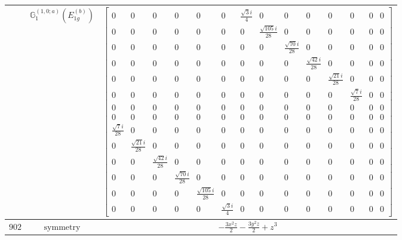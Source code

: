 \documentclass[fleqn,8pt,landscape]{jsarticle}
\begin{document}
\begin{longtable}{ccc}
$  $ & $ \mathbb{G}_{1}^{(1,0;a)}(E_{1g}^{(b)}) $ & $ \begin{bmatrix} 0 & 0 & 0 & 0 & 0 & 0 & \frac{\sqrt{3} i}{4} & 0 & 0 & 0 & 0 & 0 & 0 & 0 \\ 0 & 0 & 0 & 0 & 0 & 0 & 0 & \frac{\sqrt{105} i}{28} & 0 & 0 & 0 & 0 & 0 & 0 \\ 0 & 0 & 0 & 0 & 0 & 0 & 0 & 0 & \frac{\sqrt{70} i}{28} & 0 & 0 & 0 & 0 & 0 \\ 0 & 0 & 0 & 0 & 0 & 0 & 0 & 0 & 0 & \frac{\sqrt{42} i}{28} & 0 & 0 & 0 & 0 \\ 0 & 0 & 0 & 0 & 0 & 0 & 0 & 0 & 0 & 0 & \frac{\sqrt{21} i}{28} & 0 & 0 & 0 \\ 0 & 0 & 0 & 0 & 0 & 0 & 0 & 0 & 0 & 0 & 0 & \frac{\sqrt{7} i}{28} & 0 & 0 \\ 0 & 0 & 0 & 0 & 0 & 0 & 0 & 0 & 0 & 0 & 0 & 0 & 0 & 0 \\ 0 & 0 & 0 & 0 & 0 & 0 & 0 & 0 & 0 & 0 & 0 & 0 & 0 & 0 \\ \frac{\sqrt{7} i}{28} & 0 & 0 & 0 & 0 & 0 & 0 & 0 & 0 & 0 & 0 & 0 & 0 & 0 \\ 0 & \frac{\sqrt{21} i}{28} & 0 & 0 & 0 & 0 & 0 & 0 & 0 & 0 & 0 & 0 & 0 & 0 \\ 0 & 0 & \frac{\sqrt{42} i}{28} & 0 & 0 & 0 & 0 & 0 & 0 & 0 & 0 & 0 & 0 & 0 \\ 0 & 0 & 0 & \frac{\sqrt{70} i}{28} & 0 & 0 & 0 & 0 & 0 & 0 & 0 & 0 & 0 & 0 \\ 0 & 0 & 0 & 0 & \frac{\sqrt{105} i}{28} & 0 & 0 & 0 & 0 & 0 & 0 & 0 & 0 & 0 \\ 0 & 0 & 0 & 0 & 0 & \frac{\sqrt{3} i}{4} & 0 & 0 & 0 & 0 & 0 & 0 & 0 & 0 \end{bmatrix} $ \\ \hline
$ 902 $ & $ \text{symmetry} $ & $ - \frac{3 x^{2} z}{2} - \frac{3 y^{2} z}{2} + z^{3} $ \\

\end{longtable}
\end{document}
